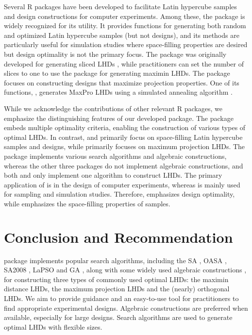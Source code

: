 Several R packages have been developed to facilitate Latin hypercube samples and design constructions for computer experiments. Among these, the  package \citep{lhs} is widely recognized for its utility. It provides functions for generating both random and optimized Latin hypercube samples (but not designs), and its methods are particularly useful for simulation studies where space-filling properties are desired but design optimality is not the primary focus. The  package \citep{SLHD} was originally developed for generating sliced LHDs \citep{ba2015optimal}, while practitioners can set the number of slices to one to use the package for generating maximin LHDs. The  package \citep{MaxPro} focuses on constructing designs that maximize projection properties. One of its functions, , generates MaxPro LHDs using a simulated annealing algorithm \citep{joseph2015maximum}.

While we acknowledge the contributions of other relevant R packages, we emphasize the distinguishing features of our developed package. The  package embeds multiple optimality criteria, enabling the construction of various types of optimal LHDs. In contrast,  and  primarily focus on space-filling Latin hypercube samples and designs, while  primarily focuses on maximum projection LHDs. The  package implements various search algorithms and algebraic constructions, whereas the other three packages do not implement algebraic constructions, and both  and  only implement one algorithm to construct LHDs. The primary application of  is in the design of computer experiments, whereas  is mainly used for sampling and simulation studies. Therefore,  emphasizes design optimality, while  emphasizes the space-filling properties of samples.

\section{Conclusion and Recommendation}\label{Con}

 package implements popular search algorithms, including the SA \citep{morris1995exploratory}, OASA \citep{leary2003optimal}, SA2008 \citep{joseph2008orthogonal}, LaPSO \citep{chen2013optimizing} and GA  \citep{liefvendahl2006study}, along with some widely used algebraic constructions \citep{wang2018optimal, ye1998orthogonal, cioppa2007efficient, sun2010construction, tang1993orthogonal, lin2009construction, butler2001optimal}, for constructing three types of commonly used optimal LHDs: the maximin distance LHDs, the maximum projection LHDs and the (nearly) orthogonal LHDs. We aim to provide guidance and an easy-to-use tool for practitioners to find appropriate experimental designs. Algebraic constructions are preferred when available, especially for large designs. Search algorithms are used to generate optimal LHDs with flexible sizes.

